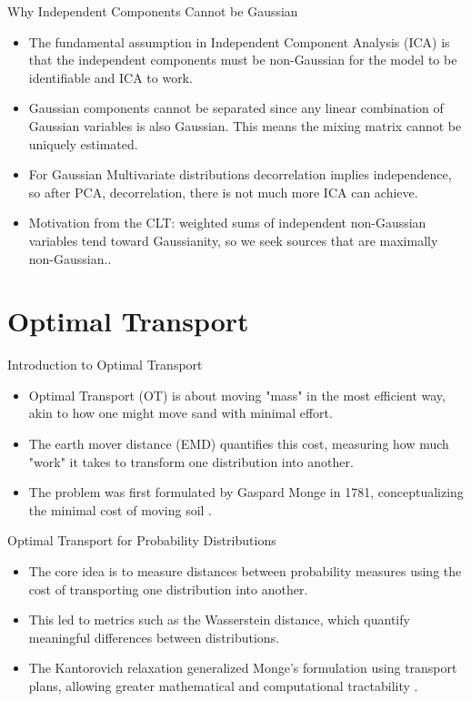 \documentclass{beamer}
\begin{document}
\begin{frame}{Why Independent Components Cannot be Gaussian}
\begin{itemize}
    \item The fundamental assumption in Independent Component Analysis (ICA) is that the independent components must be non-Gaussian for the model to be identifiable and ICA to work.
    \item Gaussian components cannot be separated since any linear combination of Gaussian variables is also Gaussian. This means the mixing matrix cannot be uniquely estimated.
    \item For Gaussian Multivariate distributions decorrelation implies independence, so after PCA, decorrelation, there is not much more ICA can achieve.
    \item Motivation from the CLT: weighted sums of independent non-Gaussian variables tend toward Gaussianity, so we seek sources that are maximally non-Gaussian.\cite{hyvarinen2001independent}.
\end{itemize}
\end{frame}

\section{Optimal Transport}

\begin{frame}{Introduction to Optimal Transport}
\begin{itemize}
    \item Optimal Transport (OT) is about moving "mass" in the most efficient way, akin to how one might move sand with minimal effort.
    \item The earth mover distance (EMD) quantifies this cost, measuring how much "work" it takes to transform one distribution into another.
    \item The problem was first formulated by Gaspard Monge in 1781, conceptualizing the minimal cost of moving soil \cite{monge1781}.
\end{itemize}
\end{frame}

\begin{frame}{Optimal Transport for Probability Distributions}
\begin{itemize}
    \item The core idea is to measure distances between probability measures using the cost of transporting one distribution into another.
    \item This led to metrics such as the Wasserstein distance, which quantify meaningful differences between distributions.
    \item The Kantorovich relaxation generalized Monge's formulation using transport plans, allowing greater mathematical and computational tractability \cite{kantorovich1942, villani2003, villani2006}.
\end{itemize}
\end{frame}
\end{document}

